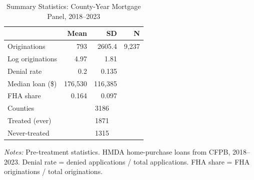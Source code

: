 \begin{table}[htbp]
\centering
\caption{Summary Statistics: County-Year Mortgage Panel, 2018--2023}
\label{tab:sumstats}
\begin{tabular}{lrrr}
\toprule
 & Mean & SD & N \\
\midrule
Originations & 793 & 2605.4 & 9,237 \\
Log originations & 4.97 & 1.81 & \\
Denial rate & 0.2 & 0.135 & \\
Median loan (\$) & 176,530 & 116,385 & \\
FHA share & 0.164 & 0.097 & \\
\addlinespace
Counties & \multicolumn{3}{c}{3186} \\
Treated (ever) & \multicolumn{3}{c}{1871} \\
Never-treated & \multicolumn{3}{c}{1315} \\
\bottomrule
\end{tabular}
\begin{tablenotes}
\item \textit{Notes:} Pre-treatment statistics. HMDA home-purchase loans from CFPB, 2018--2023.
Denial rate = denied applications / total applications. FHA share = FHA originations / total originations.
\end{tablenotes}
\end{table}
